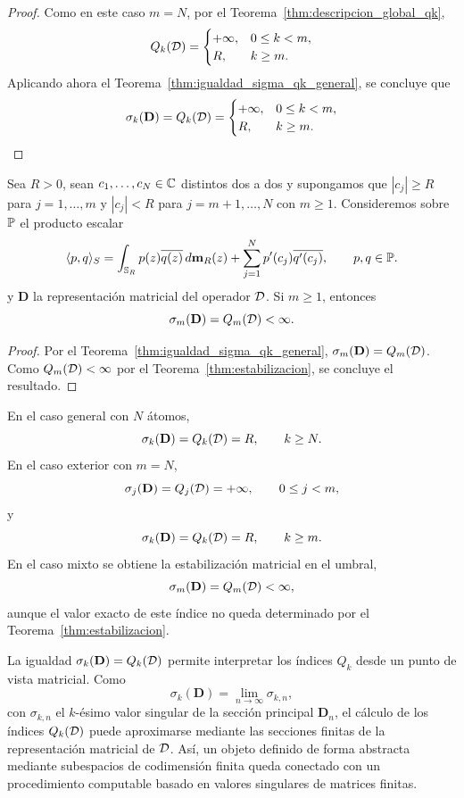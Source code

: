 \begin{proof}
	Como en este caso $m=N$, por el Teorema~\ref{thm:descripcion_global_qk},
	\[
		Q_k(\mathcal{D})=
		\begin{cases}
			+\infty, & 0\le k<m, \\
			R,       & k\ge m.
		\end{cases}
	\]
	Aplicando ahora el Teorema~\ref{thm:igualdad_sigma_qk_general}, se concluye que
	\[
		\sigma_k(\mathbf D)=Q_k(\mathcal{D})
		=
		\begin{cases}
			+\infty, & 0\le k<m, \\
			R,       & k\ge m.
		\end{cases}
	\]
\end{proof}

\begin{cor}\label{cor:estabilizacion_singular_umbral}
	Sea $R>0$, sean $c_1,\dots,c_N\in\mathbb{C}$ distintos dos a dos y supongamos que $|c_j|\ge R$ para $j=1,\dots,m$ y $|c_j|<R$ para $j=m+1,\dots,N$ con $m\ge1$. Consideremos sobre $\mathbb{P}$ el producto escalar
	\[
		\langle p,q\rangle_S
		=
		\int_{\mathbb{S}_R}p(z)\overline{q(z)}\,d\mathbf{m}_R(z)
		+
		\sum_{j=1}^N p'(c_j)\overline{q'(c_j)},
		\qquad p,q\in\mathbb{P}.
	\]
	y \(\mathbf D\) la representación matricial del operador \(\mathcal{D}\).
	Si $m\ge1$, entonces
	\[
		\sigma_m(\mathbf D)=Q_m(\mathcal{D})<\infty.
	\]
\end{cor}

\begin{proof}
	Por el Teorema~\ref{thm:igualdad_sigma_qk_general}, \(\sigma_m(\mathbf D)=Q_m(\mathcal{D})\).
	Como $Q_m(\mathcal{D})<\infty$ por el Teorema~\ref{thm:estabilizacion}, se concluye el resultado.
\end{proof}

\begin{rmk}
	En el caso general con $N$ átomos,
	\[
		\sigma_k(\mathbf D)=Q_k(\mathcal{D})=R,
		\qquad k\ge N.
	\]
	En el caso exterior con $m=N$,
	\[
		\sigma_j(\mathbf D)=Q_j(\mathcal{D})=+\infty,
		\qquad 0\le j<m,
	\]
	y
	\[
		\sigma_k(\mathbf D)=Q_k(\mathcal{D})=R,
		\qquad k\ge m.
	\]
	En el caso mixto se obtiene la estabilización matricial en el umbral,
	\[
		\sigma_m(\mathbf D)=Q_m(\mathcal{D})<\infty,
	\]
	aunque el valor exacto de este índice no queda determinado por el Teorema~\ref{thm:estabilizacion}.
\end{rmk}

\begin{rmk}
	La igualdad \(\sigma_k(\mathbf D)=Q_k(\mathcal{D})\) permite interpretar los índices \(Q_k\) desde un punto de vista matricial. Como
	\[
		\sigma_k(\mathbf D)=\lim_{n\to\infty}\sigma_{k,n},
	\]
	con \(\sigma_{k,n}\) el \(k\)-ésimo valor singular de la sección principal \(\mathbf D_n\), el cálculo de los índices \(Q_k(\mathcal{D})\) puede aproximarse mediante las secciones finitas de la representación matricial de \(\mathcal{D}\). Así, un objeto definido de forma abstracta mediante subespacios de codimensión finita queda conectado con un procedimiento computable basado en valores singulares de matrices finitas.
\end{rmk}

